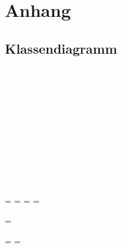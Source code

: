 \chapter{Anhang}

	\section{Klassendiagramm}
	
	
	
	
	
	\getlength{\paperwidth}\\
	\getlength{\paperheight}\\
	\getlength{\pdfpageheight}\\
	\getlength{\pdfpagewidth}\\
	\getlength{\headwidth}\\
	\getlength{\footskip}\\
	\getlength{\textwidth}\\
	\getlength{\textheight}\\
	\getlength{\vsize}\\
	\getlength{\hsize}\\
	
	\newpage
		
	\paperwidth=\pdfpageheight
	\paperheight=\pdfpagewidth
	\pdfpageheight=\paperheight
	\pdfpagewidth=\paperwidth
	\textheight
	
	\begingroup 
	\vsize=\textwidth
	\textheight
	
	\textwidth=\hsize
	\textheight=\vsize
		
		
	
